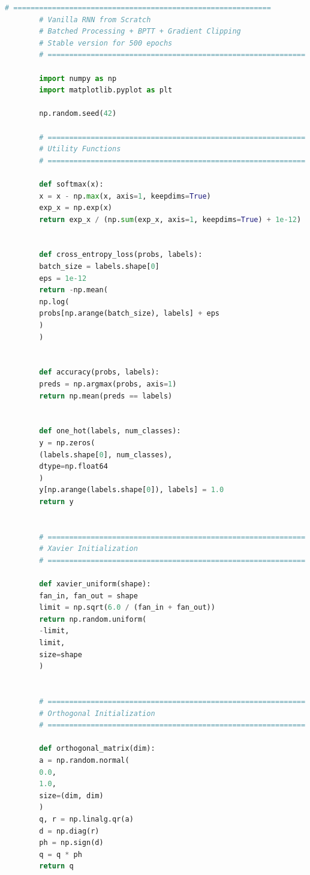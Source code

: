 \documentclass[12pt,a4paper]{article}
\begin{document}

\begin{latin}
	
	\begin{lstlisting}[language=Python,caption={Complete Stable Vanilla RNN Implementation with BPTT}]
		# ============================================================
		# Vanilla RNN from Scratch
		# Batched Processing + BPTT + Gradient Clipping
		# Stable version for 500 epochs
		# ============================================================
		
		import numpy as np
		import matplotlib.pyplot as plt
		
		np.random.seed(42)
		
		# ============================================================
		# Utility Functions
		# ============================================================
		
		def softmax(x):
		x = x - np.max(x, axis=1, keepdims=True)
		exp_x = np.exp(x)
		return exp_x / (np.sum(exp_x, axis=1, keepdims=True) + 1e-12)
		
		
		def cross_entropy_loss(probs, labels):
		batch_size = labels.shape[0]
		eps = 1e-12
		return -np.mean(
		np.log(
		probs[np.arange(batch_size), labels] + eps
		)
		)
		
		
		def accuracy(probs, labels):
		preds = np.argmax(probs, axis=1)
		return np.mean(preds == labels)
		
		
		def one_hot(labels, num_classes):
		y = np.zeros(
		(labels.shape[0], num_classes),
		dtype=np.float64
		)
		y[np.arange(labels.shape[0]), labels] = 1.0
		return y
		
		
		# ============================================================
		# Xavier Initialization
		# ============================================================
		
		def xavier_uniform(shape):
		fan_in, fan_out = shape
		limit = np.sqrt(6.0 / (fan_in + fan_out))
		return np.random.uniform(
		-limit,
		limit,
		size=shape
		)
		
		
		# ============================================================
		# Orthogonal Initialization
		# ============================================================
		
		def orthogonal_matrix(dim):
		a = np.random.normal(
		0.0,
		1.0,
		size=(dim, dim)
		)
		q, r = np.linalg.qr(a)
		d = np.diag(r)
		ph = np.sign(d)
		q = q * ph
		return q
		

\end{lstlisting}
\end{latin}
\end{document}
